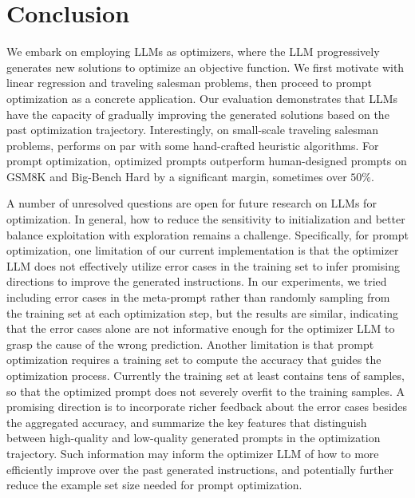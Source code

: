 \section{Conclusion}
\label{sec:conclusion}
We embark on employing LLMs as optimizers, where the LLM progressively generates new solutions to optimize an objective function.
We first motivate \name{} with linear regression and traveling salesman problems, then proceed to prompt optimization as a concrete application.
Our evaluation demonstrates that LLMs have the capacity of gradually improving the generated solutions based on the past optimization trajectory.
Interestingly, on small-scale traveling salesman problems, \name{} performs on par with some hand-crafted heuristic algorithms.
For prompt optimization, optimized prompts outperform human-designed prompts on GSM8K and Big-Bench Hard by a significant margin, sometimes over $50\%$.

A number of unresolved questions are open for future research on LLMs for optimization. 
In general, how to reduce the sensitivity to initialization and better balance exploitation with exploration remains a challenge. 
Specifically, for prompt optimization, one limitation of our current implementation is that the optimizer LLM does not effectively utilize error cases in the training set to infer promising directions to improve the generated instructions. 
In our experiments, we tried including error cases in the meta-prompt rather than randomly sampling from the training set at each optimization step, but the results are similar, indicating that the error cases alone are not informative enough for the optimizer LLM to grasp the cause of the wrong prediction.
Another limitation is that prompt optimization requires a training set to compute the accuracy that guides the optimization process. 
Currently the training set at least contains tens of samples, so that the optimized prompt does not severely overfit to the training samples. 
A promising direction is to incorporate richer feedback about the error cases besides the aggregated accuracy, and summarize the key features that distinguish between high-quality and low-quality generated prompts in the optimization trajectory.
Such information may inform the optimizer LLM of how to more efficiently improve over the past generated instructions, and potentially further reduce the example set size needed for prompt optimization.
